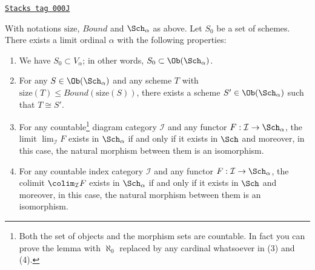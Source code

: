 \begin{lemma}
\label{sets-lemma-construct-category}
\href{https://stacks.math.columbia.edu/tag/000J}{\texttt{Stacks tag 000J}}

With notations $\text{size}$, $Bound$ and $\Sch_\alpha$ as above.
Let $S_0$ be a set of schemes. There exists a limit ordinal
$\alpha$ with the following properties:
\begin{enumerate}
\item
\label{sets-item-inclusion}
We have $S_0 \subset V_\alpha$; in other words,
$S_0 \subset \Ob(\Sch_\alpha)$.
\item
\label{sets-item-bounded}
For any $S \in \Ob(\Sch_\alpha)$ and any
scheme $T$ with $\text{size}(T) \leq Bound(\text{size}(S))$,
there exists a scheme $S' \in \Ob(\Sch_\alpha)$
such that $T \cong S'$.
\item
\label{sets-item-limit}
For any countable\footnote{Both the set of objects and
the morphism sets are countable. In fact you can prove the lemma with
$\aleph_0$ replaced by any cardinal whatsoever in (3) and (4).} diagram
category $\mathcal{I}$ and
any functor $F : \mathcal{I} \to \Sch_\alpha$, the limit
$\lim_\mathcal{I} F$ exists in $\Sch_\alpha$ if and
only if it exists in $\Sch$ and moreover, in this case,
the natural morphism between them is an isomorphism.
\item
\label{sets-item-colimit}
For any countable index category $\mathcal{I}$ and
any functor $F : \mathcal{I} \to \Sch_\alpha$, the colimit
$\colim_\mathcal{I} F$ exists in $\Sch_\alpha$ if and
only if it exists in $\Sch$ and moreover, in this case,
the natural morphism between them is an isomorphism.
\end{enumerate}
\end{lemma}

